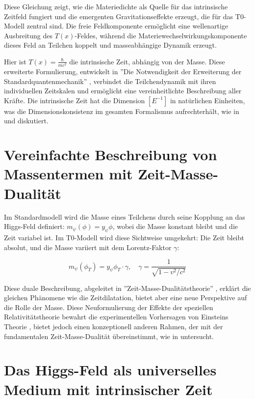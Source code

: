 \documentclass[a4paper,12pt]{article}
\newcommand{\Tfield}{T(x)}
\begin{document}
	Diese Gleichung zeigt, wie die Materiedichte als Quelle für das intrinsische Zeitfeld fungiert und die emergenten Gravitationseffekte erzeugt, die für das T0-Modell zentral sind. Die freie Feldkomponente ermöglicht eine wellenartige Ausbreitung des \(\Tfield\)-Feldes, während die Materiewechselwirkungskomponente dieses Feld an Teilchen koppelt und masseabhängige Dynamik erzeugt.
	
	Hier ist \(\Tfield = \frac{\hbar}{m c^2}\) die intrinsische Zeit, abhängig von der Masse. Diese erweiterte Formulierung, entwickelt in ''Die Notwendigkeit der Erweiterung der Standardquantenmechanik'' \cite{pascher_erweiterung_2025}, verbindet die Teilchendynamik mit ihren individuellen Zeitskalen und ermöglicht eine vereinheitlichte Beschreibung aller Kräfte. Die intrinsische Zeit hat die Dimension \([E^{-1}]\) in natürlichen Einheiten, was die Dimensionskonsistenz im gesamten Formalismus aufrechterhält, wie in \cite{pascher_alpha_2025} und \cite{pascher_alphabeta_2025} diskutiert.
	\section{Vereinfachte Beschreibung von Massentermen mit Zeit-Masse-Dualität}
	
	Im Standardmodell wird die Masse eines Teilchens durch seine Kopplung an das Higgs-Feld definiert: \(m_\psi(\phi) = y_\psi \phi\), wobei die Masse konstant bleibt und die Zeit variabel ist. Im T0-Modell wird diese Sichtweise umgekehrt: Die Zeit bleibt absolut, und die Masse variiert mit dem Lorentz-Faktor \(\gamma\):
	
	\begin{equation}
		m_\psi(\phi_T) = y_\psi \phi_T \cdot \gamma, \quad \gamma = \frac{1}{\sqrt{1 - v^2/c^2}}
	\end{equation}
	
	Diese duale Beschreibung, abgeleitet in ''Zeit-Masse-Dualitätstheorie'' \cite{pascher_params_2025}, erklärt die gleichen Phänomene wie die Zeitdilatation, bietet aber eine neue Perspektive auf die Rolle der Masse. Diese Neuformulierung der Effekte der speziellen Relativitätstheorie bewahrt die experimentellen Vorhersagen von Einsteins Theorie \cite{einstein1905}, bietet jedoch einen konzeptionell anderen Rahmen, der mit der fundamentalen Zeit-Masse-Dualität übereinstimmt, wie in \cite{pascher_zeit_masse_2025} untersucht.
	
	\section{Das Higgs-Feld als universelles Medium mit intrinsischer Zeit}
	
\end{document}
